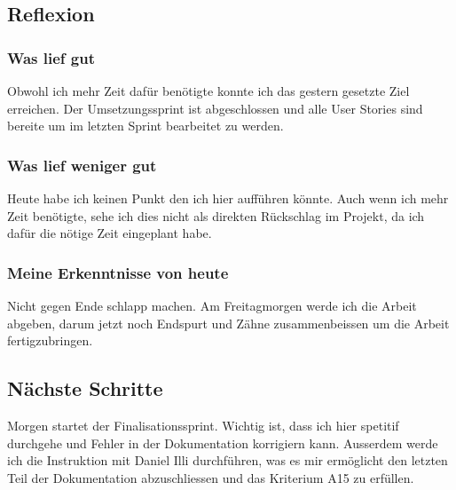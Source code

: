 \subsection*{Reflexion}

\subsubsection*{Was lief gut}
Obwohl ich mehr Zeit dafür benötigte konnte ich das gestern gesetzte Ziel erreichen. Der Umsetzungssprint ist
abgeschlossen und alle User Stories sind bereite um im letzten Sprint bearbeitet zu werden.

\subsubsection*{Was lief weniger gut}
Heute habe ich keinen Punkt den ich hier aufführen könnte. Auch wenn ich mehr Zeit benötigte, sehe ich dies
nicht als direkten Rückschlag im Projekt, da ich dafür die nötige Zeit eingeplant habe.

\subsubsection*{Meine Erkenntnisse von heute}
Nicht gegen Ende schlapp machen. Am Freitagmorgen werde ich die Arbeit abgeben, darum jetzt noch Endspurt und 
Zähne zusammenbeissen um die Arbeit fertigzubringen.

\subsection*{Nächste Schritte}
Morgen startet der Finalisationssprint. Wichtig ist, dass ich hier spetitif durchgehe und Fehler in der Dokumentation korrigiern kann.
Ausserdem werde ich die Instruktion mit Daniel Illi durchführen, was es mir ermöglicht den letzten Teil der Dokumentation abzuschliessen und das 
Kriterium A15 zu erfüllen.

\pagebreak
